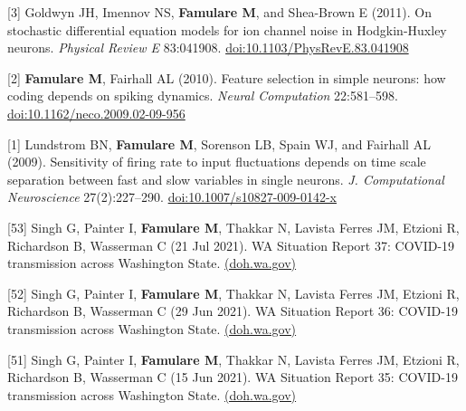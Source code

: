 \documentclass{article}
\begin{document}
\begin{llist}
\begin{items}
\item[{[3]}] Goldwyn JH, Imennov NS, \textbf{Famulare M}, and Shea-Brown E (2011).  On stochastic differential equation models for ion channel noise in Hodgkin-Huxley neurons. \emph{Physical Review E} 83:041908. \href{https://doi.org/10.1103/PhysRevE.83.041908}{doi:10.1103/PhysRevE.83.041908}

\item[{[2]}] \textbf{Famulare M}, Fairhall AL (2010). Feature selection in simple neurons: how coding depends on spiking dynamics. \emph{Neural Computation} 22:581--598. \href{https://doi.org/10.1162/neco.2009.02-09-956}{doi:10.1162/neco.2009.02-09-956}

\item[{[1]}] Lundstrom BN, \textbf{Famulare M}, Sorenson LB, Spain WJ, and Fairhall AL (2009).  Sensitivity of firing rate to input fluctuations depends on time scale separation between fast and slow variables in single neurons.  \emph{J. Computational Neuroscience} 27(2):227--290. \href{https://doi.org/10.1007/s10827-009-0142-x}{doi:10.1007/s10827-009-0142-x} \\

\end{items}

  \vspace{4pt}

\begin{items}
	
	\item[{[53]}] Singh G, Painter I, \textbf{Famulare M}, Thakkar N,  Lavista Ferres JM, Etzioni R, Richardson B, Wasserman C (21 Jul 2021). WA Situation Report 37: COVID-19 transmission across Washington State. \href{https://www.doh.wa.gov/Portals/1/Documents/1600/coronavirus/data-tables/820-114-SituationReport-20210721.pdf}{(doh.wa.gov)}
	
	\item[{[52]}] Singh G, Painter I, \textbf{Famulare M}, Thakkar N,  Lavista Ferres JM, Etzioni R, Richardson B, Wasserman C (29 Jun 2021). WA Situation Report 36: COVID-19 transmission across Washington State. \href{https://www.doh.wa.gov/Portals/1/Documents/1600/coronavirus/data-tables/820-114-SituationReport-20210630.pdf}{(doh.wa.gov)}
	
	\item[{[51]}] Singh G, Painter I, \textbf{Famulare M}, Thakkar N,  Lavista Ferres JM, Etzioni R, Richardson B, Wasserman C (15 Jun 2021). WA Situation Report 35: COVID-19 transmission across Washington State. \href{https://www.doh.wa.gov/Portals/1/Documents/1600/coronavirus/data-tables/820-114-SituationReport-20210616.pdf}{(doh.wa.gov)}
		

\end{items}
\end{llist}
\end{document}
